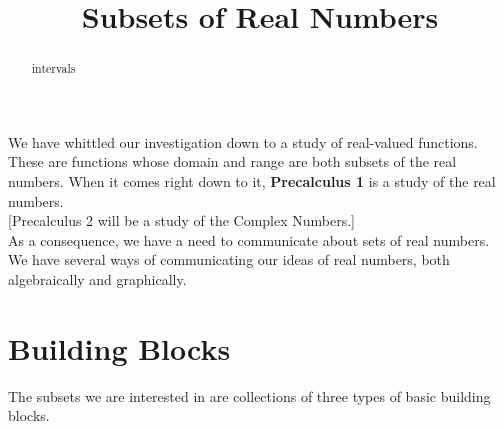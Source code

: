 \documentclass{ximera}
\title{Subsets of Real Numbers}
\begin{document}
\begin{abstract}
intervals
\end{abstract}
\maketitle




We have whittled our investigation down to a study of real-valued functions.  These are functions whose domain and range are both subsets of the real numbers.  When it comes right down to it, \textbf{Precalculus 1} is a study of the real numbers. \\




[Precalculus 2 will be a study of the Complex Numbers.] \\



As a consequence, we have a need to communicate about sets of real numbers.  We have several ways of communicating our ideas of real numbers, both algebraically and graphically.


\section{Building Blocks}

The subsets we are interested in are collections of three types of basic building blocks.
\end{document}
